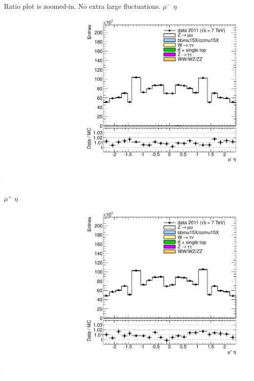 {
\centering
Ratio plot is zoomed-in. No extra large fluctuations.
\newline
\colb[T]
\centering
$\mu^-$ $\eta$ \\
\includegraphics[width=1.0\textwidth]{dates/20121119/figures/zplots/lN_eta_nomatch.pdf}

\centering
$\mu^+$ $\eta$ \\
\includegraphics[width=1.0\textwidth]{dates/20121119/figures/zplots/lP_eta_nomatch.pdf}
\cole
}

